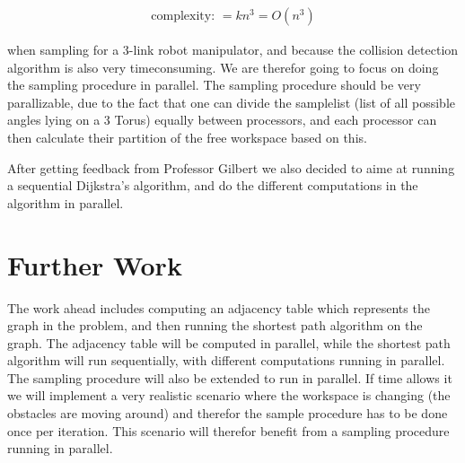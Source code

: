 \begin{align}
\label{eq:}
\text{complexity: } = kn^3=O(n^3) 
 \end{align}

when sampling for a 3-link robot manipulator, and because the collision detection algorithm is also very timeconsuming. We are therefor going to focus on doing the sampling procedure in parallel. The sampling procedure should be very parallizable, due to the fact that one can divide the samplelist (list of all possible angles lying on a 3 Torus) equally between processors, and each processor can then calculate their partition of the free workspace based on this. 

After getting feedback from Professor Gilbert we also decided to  aime at running a sequential Dijkstra's algorithm, and do the different computations in the algorithm in parallel. 

\section*{Further Work}

The work ahead includes computing an adjacency table which represents the graph in the problem, and then running the shortest path algorithm on the graph. The adjacency table will be computed in parallel, while the shortest path algorithm will run sequentially, with different computations running in parallel. The sampling procedure will also be extended to run in parallel. If time allows it we will implement a very realistic scenario where the workspace is changing (the obstacles are moving around) and therefor the sample procedure has to be done once per iteration. This scenario will therefor benefit from a sampling procedure running in parallel.








